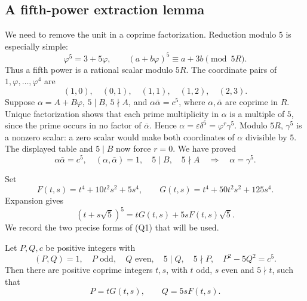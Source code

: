 \subsection{A fifth-power extraction lemma}

We need to remove the unit in a coprime factorization.  Reduction modulo
\(5\) is especially simple:
\[
 \varphi^5=3+5\varphi,\qquad
 (a+b\varphi)^5\equiv a+3b\pmod{5R}.
\]
Thus a fifth power is a rational scalar modulo \(5R\).  The coordinate
pairs of \(1,\varphi,\ldots,\varphi^4\) are
\[
 (1,0),\quad(0,1),\quad(1,1),\quad(1,2),\quad(2,3).
\]
Suppose \(\alpha=A+B\varphi\), \(5\mid B\), \(5\nmid A\), and
\(\alpha\bar\alpha=c^5\), where \(\alpha,\bar\alpha\) are coprime in
\(R\).  Unique factorization shows that each prime multiplicity in
\(\alpha\) is a multiple of \(5\), since the prime occurs in no factor
of \(\bar\alpha\).  Hence
\(\alpha=\varepsilon\delta^5=\varphi^r\gamma^5\).
Modulo \(5R\), \(\gamma^5\) is a nonzero scalar: a zero scalar
would make both coordinates of \(\alpha\) divisible by \(5\).
The displayed table and \(5\mid B\) now force \(r=0\).
We have proved
\[
 \boxed{\quad
 \alpha\bar\alpha=c^5,\quad
 (\alpha,\bar\alpha)=1,\quad
 5\mid B,\quad5\nmid A
 \quad\Longrightarrow\quad \alpha=\gamma^5.
 \quad}
 \tag{Q1}\label{eq:quintic-extraction}
\]

Set
\[
 F(t,s)=t^4+10t^2s^2+5s^4,\qquad
 G(t,s)=t^4+50t^2s^2+125s^4.
\]
Expansion gives
\[
 (t+s\sqrt5)^5=tG(t,s)+5sF(t,s)\sqrt5.
 \tag{Q2}\label{eq:quintic-expansion}
\]
We record the two precise forms of (Q1) that will be used.

\begin{lemma}\label{lem:quintic-direct}
Let \(P,Q,c\) be positive integers with
\[
 (P,Q)=1,\quad P\text{ odd},\quad Q\text{ even},\quad
 5\mid Q,\quad5\nmid P,\quad P^2-5Q^2=c^5.
\]
Then there are positive coprime integers \(t,s\), with \(t\) odd,
\(s\) even and \(5\nmid t\), such that
\[
 P=tG(t,s),\qquad Q=5sF(t,s).
 \tag{Q3}\label{eq:quintic-direct}
\]
\end{lemma}


